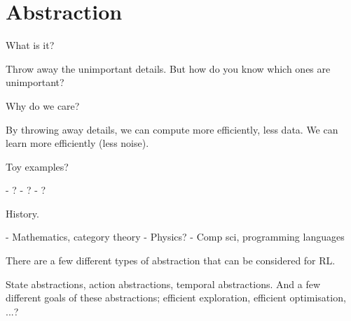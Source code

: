 \chapter{Abstraction}\label{C:abstraction}

What is it?

Throw away the unimportant details. But how do you know which ones are unimportant?

Why do we care?

By throwing away details, we can compute more efficiently, less data.
We can learn more efficiently (less noise).


Toy examples?

- ?
- ?
- ?

History.

- Mathematics, category theory
- Physics?
- Comp sci, programming languages


There are a few different types of abstraction that can be considered for RL.

State abstractions, action abstractions, temporal abstractions.
And a few different goals of these abstractions; efficient exploration, efficient optimisation, ...?
